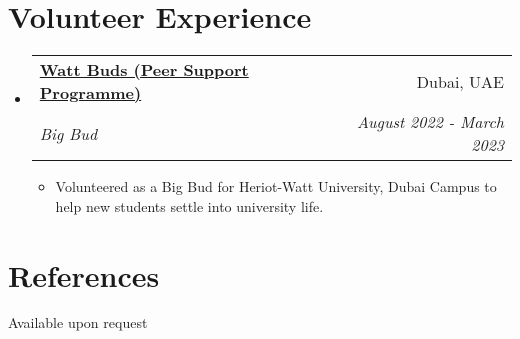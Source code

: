 \documentclass[a4paper,20pt]{article}
\makeatletter
\newcommand{\resumeItemWithoutTitle}[1] {
	\item\small{
		{#1 \vspace{-2pt}}
	}
}
\newcommand{\resumeSubheading}[4] {
	\vspace{-1pt}\item
	\begin{tabular*}{0.97\textwidth}{l@{\extracolsep{\fill}}r}
		\textbf{#1} & #2 \\
		\textit{#3} & \textit{#4} \\
	\end{tabular*}\vspace{-5pt}
}
\newcommand{\resumeSubHeadingListStart}{\begin{itemize}[leftmargin=*]}
\newcommand{\resumeSubHeadingListEnd}{\end{itemize}}
\newcommand{\resumeItemListStart}{\begin{itemize}}
\newcommand{\resumeItemListEnd}{\end{itemize}\vspace{-5pt}}
\makeatother
\begin{document}
\vspace{-2pt}
\section{Volunteer Experience}
	\resumeSubHeadingListStart
		\resumeSubheading{\href{https://www.hw.ac.uk/uk/students/studies/wattbuds-dubai.htm}{Watt Buds (Peer Support Programme)}}{Dubai, UAE}
		{Big Bud}{August 2022 - March 2023}
			\resumeItemListStart
				\resumeItemWithoutTitle{Volunteered as a Big Bud for Heriot-Watt University, Dubai Campus to help new students settle into university life.}
			\resumeItemListEnd


	\resumeSubHeadingListEnd

\vspace{-5pt}
\section{References}
	Available upon request
\end{document}
